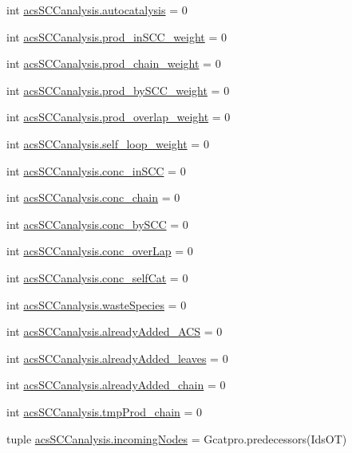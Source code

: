 \begin{DoxyCompactItemize}
\item 
int \hyperlink{a00128_a70ccd5d519e878c6c8a7d0aa73caf46c}{acs\-S\-C\-Canalysis.\-autocatalysis} = 0
\item 
int \hyperlink{a00128_aa22adccedd9ae548d0687df507ebd92d}{acs\-S\-C\-Canalysis.\-prod\-\_\-in\-S\-C\-C\-\_\-weight} = 0
\item 
int \hyperlink{a00128_a6736365f1f19058f6e1d57287383dbcc}{acs\-S\-C\-Canalysis.\-prod\-\_\-chain\-\_\-weight} = 0
\item 
int \hyperlink{a00128_a5f45dbe461b3b18021c93780e87cc40e}{acs\-S\-C\-Canalysis.\-prod\-\_\-by\-S\-C\-C\-\_\-weight} = 0
\item 
int \hyperlink{a00128_ab78b07d6cd1a94356c4fee43dfc1272a}{acs\-S\-C\-Canalysis.\-prod\-\_\-overlap\-\_\-weight} = 0
\item 
int \hyperlink{a00128_ae9790fbc87f233c94224436a9cbd59c1}{acs\-S\-C\-Canalysis.\-self\-\_\-loop\-\_\-weight} = 0
\item 
int \hyperlink{a00128_a3fcb8f9c7e88b5c53f1201a383b38666}{acs\-S\-C\-Canalysis.\-conc\-\_\-in\-S\-C\-C} = 0
\item 
int \hyperlink{a00128_a3188cc39362e42ecb36d23a98f2b5a78}{acs\-S\-C\-Canalysis.\-conc\-\_\-chain} = 0
\item 
int \hyperlink{a00128_aac2f508d526d62bd7f9d4f5a5f8b1821}{acs\-S\-C\-Canalysis.\-conc\-\_\-by\-S\-C\-C} = 0
\item 
int \hyperlink{a00128_afd3169174539244248b78c8da2bba265}{acs\-S\-C\-Canalysis.\-conc\-\_\-over\-Lap} = 0
\item 
int \hyperlink{a00128_a9e8cc07f7d7f892f3f72274318dcbcef}{acs\-S\-C\-Canalysis.\-conc\-\_\-self\-Cat} = 0
\item 
int \hyperlink{a00128_ace0de61f3c6aa14b4197156be3a68280}{acs\-S\-C\-Canalysis.\-waste\-Species} = 0
\item 
int \hyperlink{a00128_a38f20e6b1cad6a61f1c9b87b37c76f63}{acs\-S\-C\-Canalysis.\-already\-Added\-\_\-\-A\-C\-S} = 0
\item 
int \hyperlink{a00128_ac842390795cf193351c795945cde8e77}{acs\-S\-C\-Canalysis.\-already\-Added\-\_\-leaves} = 0
\item 
int \hyperlink{a00128_ac1b286545469555eb284f9b5f2bd984f}{acs\-S\-C\-Canalysis.\-already\-Added\-\_\-chain} = 0
\item 
int \hyperlink{a00128_aee6b4f50387d471b70458cf703c0863b}{acs\-S\-C\-Canalysis.\-tmp\-Prod\-\_\-chain} = 0
\item 
tuple \hyperlink{a00128_a540ba5319ee67d8a2323099dad73ba36}{acs\-S\-C\-Canalysis.\-incoming\-Nodes} = Gcatpro.\-predecessors(Ids\-O\-T)

\end{DoxyCompactItemize}
